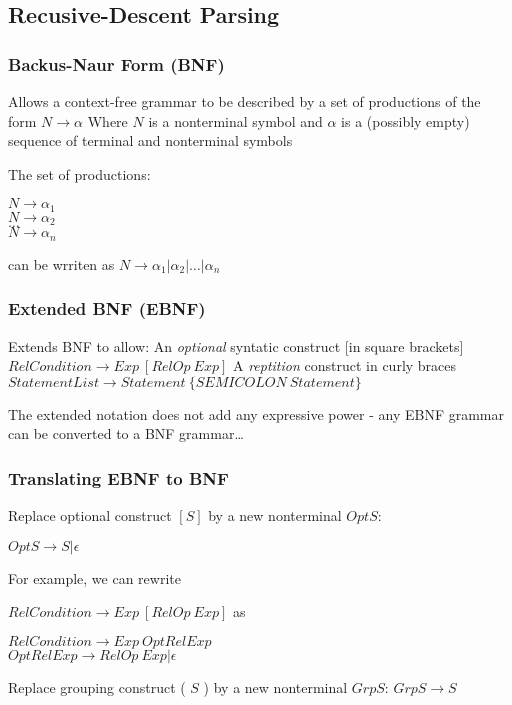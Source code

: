 \subsection{Recusive-Descent Parsing}
\subsubsection{Backus-Naur Form (BNF)}
Allows a context-free grammar to be described by a set of productions of the form
$N \rightarrow \alpha$
Where $N$ is a nonterminal symbol and $\alpha$ is a (possibly empty) sequence of terminal and nonterminal symbols

The set of productions:

$N \rightarrow \alpha_1$ \\
$N \rightarrow \alpha_2$ \\
$\ldots$ \\[0.1cm]
$N \rightarrow \alpha_n$

can be wrriten as
$N \rightarrow \alpha_1 | \alpha_2 | \ldots | \alpha_n$

\subsubsection{Extended BNF (EBNF)}
Extends BNF to allow:
An \emph{optional} syntatic construct [in square brackets]
$RelCondition \rightarrow Exp \ [RelOp \ Exp]$
A \emph{reptition} construct {in curly braces}
$StatementList \rightarrow Statement \ \{SEMICOLON \ Statement \}$

The extended notation does not add any expressive power - any EBNF grammar can be converted to a BNF grammar\dots

\subsubsection{Translating EBNF to BNF}

Replace optional construct $[S]$ by a new nonterminal $OptS$:

$OptS \rightarrow S | \epsilon$

For example, we can rewrite

$RelCondition \rightarrow Exp \ [RelOp \ Exp]$
as

$RelCondition \rightarrow Exp \ OptRelExp$ \\
$OptRelExp \rightarrow RelOp \ Exp | \epsilon$

Replace grouping construct ( $S$ ) by a new nonterminal $GrpS$:
$GrpS \rightarrow S$

